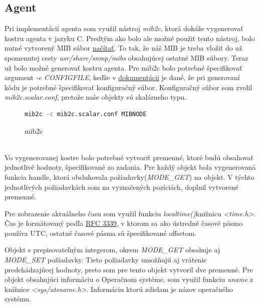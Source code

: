 \documentclass{article}
\begin{document}
    \subsection{Agent}
    Pri implementácií agenta som využil nástroj \textit{mib2c}, ktorá dokáže vygenerovať kostru agenta v jazyku C. Predtým ako bolo ale možné použiť tento nástroj, bolo nutné vytvorený MIB súbor \href{http://www.net-snmp.org/wiki/index.php/TUT:Using_and_loading_MIBS}{načítať}. To tak, že náš MIB je treba vložiť do už spomenutej cesty \textit{usr/share/snmp/mibs} obsahujúcej ostatné MIB súbory. Teraz už bolo možné generovať kostru agenta. Pre mib2c bolo potrebné špecifikovať argument \textit{-c CONFIGFILE}, keďže v \href{http://www.net-snmp.org/docs/man/mib2c.html}{dokumentácii} je dané, že pri generovaní kódu je potrebné špecifikovať konfiguračný súbor. Konfiguračný súbor som zvolil \textit{mib2c.scalar.conf}, pretože naše objekty sú skalárneho typu.
    \begin{figure}[!htb]
	    \begin{lstlisting}[language=bash]
                    mib2c -c mib2c.scalar.conf MIBNODE
        \end{lstlisting}
        \caption{mib2c}
    \end{figure}
   \vspace{1cm}
    \\
    Vo vygenerovanej kostre bolo potrebné vytvoriť premenné, ktoré budú obsahovať jednotlivé hodnoty, špecifikované zo zadania. Pre každý objekt bola vygenerovaná funkcia handle, ktorá obsluhovala požiadavky(\textit{MODE\_GET}) na objekt. V týchto jednotlivých požiadavkách som na vyznačených pozíciách, doplnil vytvorené premenné. 
    
    Pre zobrazenie aktuálneho času som využil funkciu \textit{localtime()}knižnicu \textit{<time.h>}. Čas je formátovaný podľa \href{https://tools.ietf.org/html/rfc3339}{RFC 3339}, v ktorom sa ako ústredné časové pásmo používa UTC, ostatné časové pásma sú špecifikované offsetom.
    
    Objekt s prepisovateľným integerom, okrem \textit{MODE\_GET} obsahuje aj \textit{MODE\_SET} požiadavky. Tieto požiadavky umožňujú aj vrátenie predchádzajúcej hodnoty, preto som pre tento objekt vytvoril dve premenné. 
    Pre objekt obsahujúci informáciu o Operačnom systéme, som využil funkciu \textit{uname} z knižnice \textit{<sys/utsname.h>}. Informáciu ktorú zdielam je názov operačného systému.
    
    \vspace{1cm}
\end{document}
